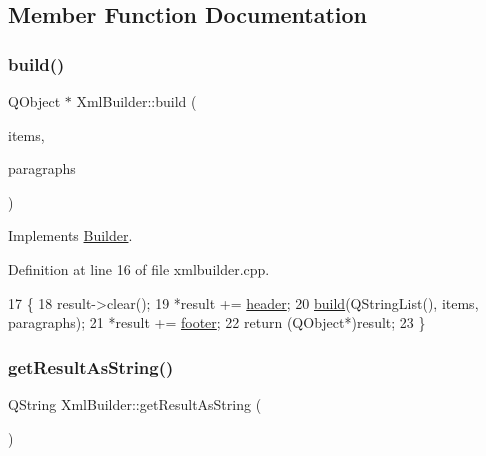 \subsection{Member Function Documentation}
\mbox{\label{class_xml_builder_a29a46891d09f490c19c1063884b66f33}} 
\subsubsection{\texorpdfstring{build()}{build()}}
{\footnotesize\ttfamily Q\+Object $\ast$ Xml\+Builder\+::build (\begin{DoxyParamCaption}\item[{Q\+List$<$ \hyperlink{class_item}{Item} $\ast$$>$}]{items,  }\item[{Q\+List$<$ \hyperlink{class_paragraph}{Paragraph} $>$}]{paragraphs }\end{DoxyParamCaption})\hspace{0.3cm}{\ttfamily [virtual]}}



Implements \hyperlink{class_builder_a92d31ffc3502acebf0cd074e8b084751}{Builder}.



Definition at line 16 of file xmlbuilder.\+cpp.


\begin{DoxyCode}
17 \{
18     result->clear();
19     *result += \hyperlink{class_builder_ae3800e384b079c2d66ab4d8f98cbb4ad}{header};
20     \hyperlink{class_xml_builder_a29a46891d09f490c19c1063884b66f33}{build}(QStringList(), items, paragraphs);
21     *result += \hyperlink{class_builder_a5ace791b99eb11341d6f39e35fdd2ce7}{footer};
22     \textcolor{keywordflow}{return} (QObject*)result;
23 \}
\end{DoxyCode}
\mbox{\label{class_xml_builder_af445b2645cb7bc6e15ccca26fca26c83}} 
\subsubsection{\texorpdfstring{get\+Result\+As\+String()}{getResultAsString()}}
{\footnotesize\ttfamily Q\+String Xml\+Builder\+::get\+Result\+As\+String (\begin{DoxyParamCaption}{ }\end{DoxyParamCaption})}



